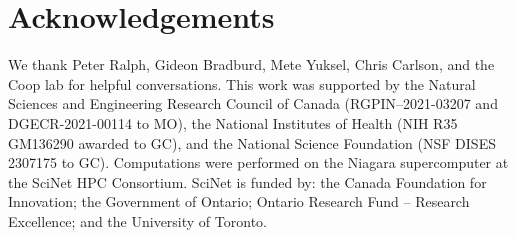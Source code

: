 \section{Acknowledgements}

We thank Peter Ralph, Gideon Bradburd, Mete Yuksel, Chris Carlson, and the Coop lab for helpful conversations. This work was supported by the Natural Sciences and Engineering Research Council of Canada (RGPIN–2021-03207 and DGECR-2021-00114 to MO), the National Institutes of Health (NIH R35 GM136290 awarded to GC), and the National Science Foundation (NSF DISES 2307175 to GC). Computations were performed on the Niagara supercomputer at the SciNet HPC Consortium. SciNet is funded by: the Canada Foundation for Innovation; the Government of Ontario; Ontario Research Fund – Research Excellence; and the University of Toronto.